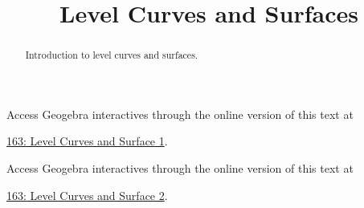 \documentclass{ximera}
\title{Level Curves and Surfaces}
\begin{document}
\begin{abstract}
Introduction to level curves and surfaces.
\end{abstract}
\maketitle



\begin{example}  \label{Edfhpgdf45}

 
\begin{onlineOnly}
    \begin{center}
\end{center}
\end{onlineOnly}

Access Geogebra interactives through the online version of this text at
 
\href{https://www.geogebra.org/classic/nk4ap6kj}{163: Level Curves and Surface 1}.
\end{example}



\begin{example}  \label{Edfhpgdf45}

 
\begin{onlineOnly}
    \begin{center}
\end{center}
\end{onlineOnly}

Access Geogebra interactives through the online version of this text at
 
\href{https://www.geogebra.org/classic/vk7zt92m}{163: Level Curves and Surface 2}.
\end{example}
\end{document}
